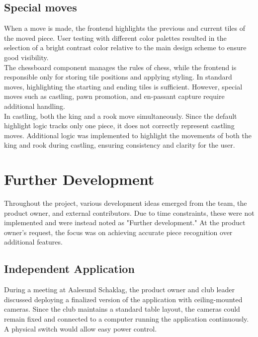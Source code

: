 \subsection{Special moves}
When a move is made, the frontend highlights the previous and current tiles of the moved piece. User testing with different color palettes resulted in the selection of a bright contrast color relative to the main design scheme to ensure good visibility. \\

The chessboard component manages the rules of chess, while the frontend is responsible only for storing tile positions and applying styling. In standard moves, highlighting the starting and ending tiles is sufficient. However, special moves such as \gls{castling}, pawn \gls{promotion}, and \gls{en-passant} capture require additional handling. \\

In \gls{castling}, both the king and a rook move simultaneously. Since the default highlight logic tracks only one piece, it does not correctly represent \gls{castling} moves. Additional logic was implemented to highlight the movements of both the king and rook during \gls{castling}, ensuring consistency and clarity for the user.







\section{Further Development}
Throughout the project, various development ideas emerged from the team, the product owner, and external contributors. Due to time constraints, these were not implemented and were instead noted as "Further development." At the product owner's request, the focus was on achieving accurate piece recognition over additional features.

\subsection{Independent Application}
During a meeting at Aalesund Schaklag, the product owner and club leader discussed deploying a finalized version of the application with ceiling-mounted cameras. Since the club maintains a standard table layout, the cameras could remain fixed and connected to a computer running the application continuously. A physical switch would allow easy power control. \\

